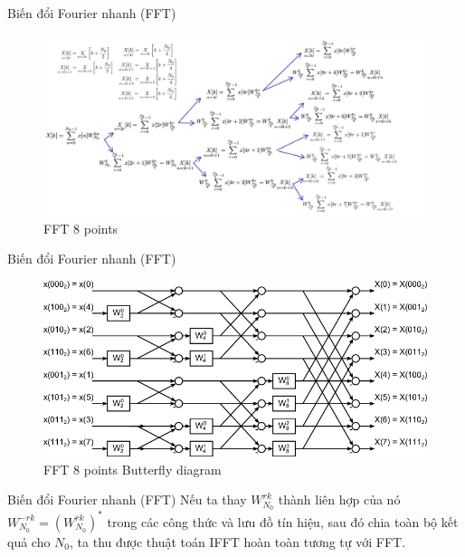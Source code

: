\documentclass[8pt]{beamer}
\begin{document}
\begin{frame}{Biến đổi Fourier nhanh (FFT)}
\begin{figure}[h]
			\includegraphics[width=1.1\textwidth]{8.jpg}

			\caption{FFT 8 points}			\label{fig:re8}

		\end{figure}
\end{frame}
\begin{frame}{Biến đổi Fourier nhanh (FFT)}
\begin{figure}[h]
			\includegraphics[width=1\textwidth]{9.png}

			\caption{FFT 8 points Butterfly diagram}			\label{fig:re9}

		\end{figure}

\end{frame}
\begin{frame}{Biến đổi Fourier nhanh (FFT)}
Nếu ta thay $W_{N_{0}}^{rk}$ thành liên hợp của nó $W_{N_{0}}^{-rk}=(W_{N_{0}}^{rk})^*$ trong các công thức và lưu đồ tín hiệu, sau đó chia toàn bộ kết quả cho $N_{0}$, ta thu được thuật toán IFFT hoàn toàn tương tự với FFT.
\end{frame}
\end{document}
